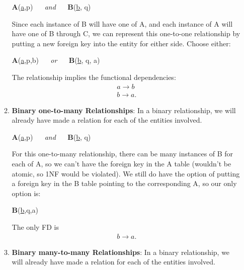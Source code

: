 \documentclass{report}
\begin{document}
\begin{itemize}
\begin{enumerate}
\begin{center}
                        \textbf{A}(\underline{a},p) $\quad$ \textit{and} $\quad$ \textbf{B}(\underline{b}, q)
                    \end{center}
                    \bigbreak \noindent 
                    Since each instance of B will have one of A, and each instance of A will have one of B through C, we can represent this one-to-one relationship by putting a new foreign key into the entity for either side. Choose either:
                    \begin{center}
                        \textbf{A}(\underline{a},p,b\dag) $\quad$ \textit{or} $\quad$ \textbf{B}(\underline{b}, q, a\dag)
                    \end{center}
                    \bigbreak \noindent 
                    The relationship implies the functional dependencies:
                    \begin{align*}
                        a \to b \\
                        b \to a
                    .\end{align*}
                \item \textbf{Binary one-to-many Relationships}: In a binary relationship, we will already have made a relation for each of the entities involved.
                    \begin{center}
                        \textbf{A}(\underline{a},p) $\quad$ \textit{and} $\quad$ \textbf{B}(\underline{b}, q)
                    \end{center}
                    \bigbreak \noindent 
                    For this one-to-many relationship, there can be many instances of B for each of A, so we can’t have the foreign key in the A table (wouldn’t be atomic, so 1NF would be violated). We still do have the option of putting a foreign key in the B table pointing to the corresponding A, so our only option is: \begin{center}
                        \textbf{B}(\underline{b},q,a\dag)
                    \end{center}
                    \bigbreak \noindent 
                    The only FD is 
                    \begin{align*}
                        b \to a 
                    .\end{align*}
                    \bigbreak \noindent 
                \item \textbf{Binary many-to-many Relationships}: In a binary relationship, we will already have made a relation for each of the entities involved.

\end{enumerate}
\end{itemize}
\end{document}
